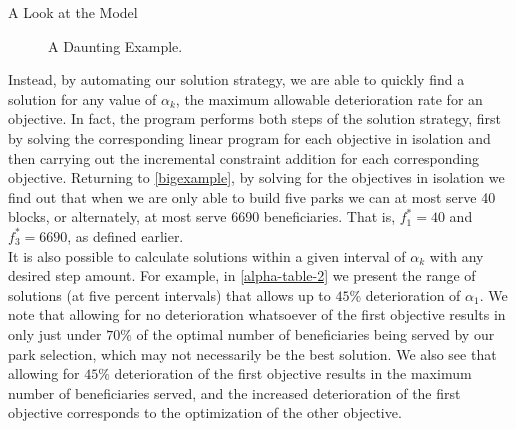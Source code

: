 \documentclass[12pt]{pom_thesis}
\theoremstyle{definition}
\begin{document}
\begin{chapter}{A Look at the Model}
\begin{figure}
\centering
\caption{A Daunting Example.}
\label{bigexample}
\end{figure}

Instead, by automating our solution strategy, we are able to quickly find a solution for any value of $\alpha_k$, the maximum allowable deterioration rate for an objective. In fact, the program performs both steps of the solution strategy, first by solving the corresponding linear program for each objective in isolation and then carrying out the incremental constraint addition for each corresponding objective. Returning to \autoref{bigexample}, by solving for the objectives in isolation we find out that when we are only able to build five parks we can at most serve 40 blocks, or alternately, at most serve 6690 beneficiaries. That is, $f_1^* = 40$ and $f_3^* = 6690$, as defined earlier. \\

It is also possible to calculate solutions within a given interval of $\alpha_k$ with any desired step amount. For example, in \autoref{alpha-table-2} we present the range of solutions (at five percent intervals) that allows up to $45\%$ deterioration of $\alpha_1$. We note that allowing for no deterioration whatsoever of the first objective results in only just under $70\%$ of the optimal number of beneficiaries being served by our park selection, which may not necessarily be the best solution. We also see that allowing for $45\%$ deterioration of the first objective results in the maximum number of beneficiaries served, and the increased deterioration of the first objective corresponds to the optimization of the other objective.\\


\end{chapter}
\end{document}
